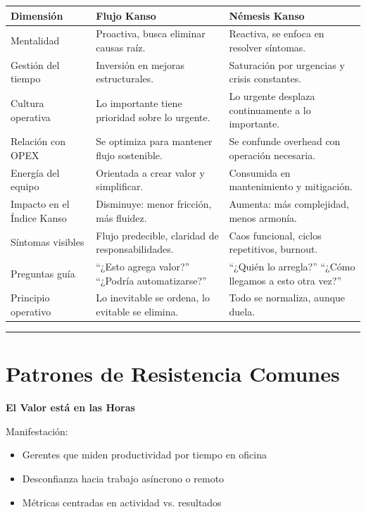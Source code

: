 \begin{center}
\scriptsize
\begin{tabular}{|p{3cm}|p{5cm}|p{5cm}|}
\hline
Dimensión & Flujo Kanso & Némesis Kanso \\ \hline
Mentalidad & Proactiva, busca eliminar causas raíz. & Reactiva, se enfoca en resolver síntomas. \\ \hline
Gestión del tiempo & Inversión en mejoras estructurales. & Saturación por urgencias y crisis constantes. \\ \hline
Cultura operativa & Lo importante tiene prioridad sobre lo urgente. & Lo urgente desplaza continuamente a lo importante. \\ \hline
Relación con OPEX & Se optimiza para mantener flujo sostenible. & Se confunde overhead con operación necesaria. \\ \hline
Energía del equipo & Orientada a crear valor y simplificar. & Consumida en mantenimiento y mitigación. \\ \hline
Impacto en el Índice Kanso & Disminuye: menor fricción, más fluidez. & Aumenta: más complejidad, menos armonía. \\ \hline
Síntomas visibles & Flujo predecible, claridad de responsabilidades. & Caos funcional, ciclos repetitivos, burnout. \\ \hline
Preguntas guía & ``¿Esto agrega valor?'' ``¿Podría automatizarse?'' & ``¿Quién lo arregla?'' ``¿Cómo llegamos a esto otra vez?'' \\ \hline
Principio operativo & Lo inevitable se ordena, lo evitable se elimina. & Todo se normaliza, aunque duela. \\ \hline
\end{tabular}
\end{center}

\hrule

\section{Patrones de Resistencia Comunes}

\textbf{El Valor está en las Horas}

Manifestación:
\begin{itemize}
    \item Gerentes que miden productividad por tiempo en oficina
    \item Desconfianza hacia trabajo asíncrono o remoto
    \item Métricas centradas en actividad vs. resultados
\end{itemize}

